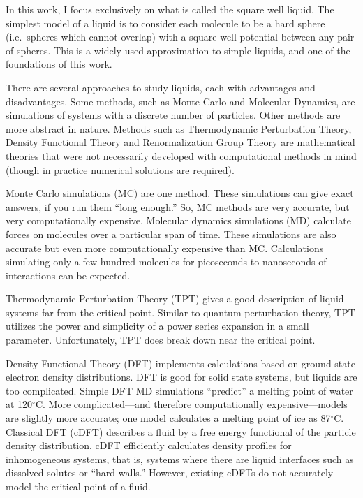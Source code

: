 \documentclass[letterpaper,twocolumn,amsmath,amssymb,prb]{revtex4-1}
\begin{document}
In this work, I focus exclusively on what is called the square well
liquid. The simplest model of a liquid is to consider each molecule to
be a hard sphere (i.e.~spheres which cannot overlap) with a square-well
potential between any pair of spheres. This is a widely used
approximation to simple liquids, and one of the foundations of
this work.

There are several approaches to study liquids, each with advantages
and disadvantages. Some methods, such as Monte Carlo and Molecular
Dynamics, are simulations of systems with a discrete number of
particles. Other methods are more abstract in nature. Methods such as
Thermodynamic Perturbation Theory, Density Functional Theory and
Renormalization Group Theory are mathematical theories that were not
necessarily developed with computational methods in mind (though in
practice numerical solutions are required).

Monte Carlo simulations (MC) are one method. These simulations can
give exact answers, if you run them ``long enough.''  So, MC methods
are very accurate, but very computationally expensive. Molecular
dynamics simulations (MD) calculate forces on molecules over a
particular span of time. These simulations are also accurate but even
more computationally expensive than MC. Calculations simulating only a
few hundred molecules for picoseconds to nanoseconds of interactions
can be expected.\cite{Hughes13}

Thermodynamic Perturbation Theory (TPT) gives a good description of
liquid systems far from the critical point. Similar to quantum
perturbation theory, TPT utilizes the power and simplicity of a power
series expansion in a small parameter. Unfortunately, TPT does break
down near the critical point.

Density Functional Theory (DFT) implements calculations based on
ground-state electron density distributions. DFT is good for solid
state systems, but liquids are too complicated. Simple DFT MD
simulations ``predict'' a melting point of water at 120$^\circ$C. More
complicated---and therefore computationally expensive---models are
slightly more accurate; one model calculates a melting point of ice as
87$^\circ$C.\cite{Yoo11} Classical DFT (cDFT) describes a fluid by a
free energy functional of the particle density
distribution.\cite{Krebs13} cDFT efficiently calculates density
profiles for inhomogeneous systems, that is, systems where there are
liquid interfaces such as dissolved solutes or ``hard walls.''
However, existing cDFTs do not accurately model the critical point of
a fluid.
\end{document}

